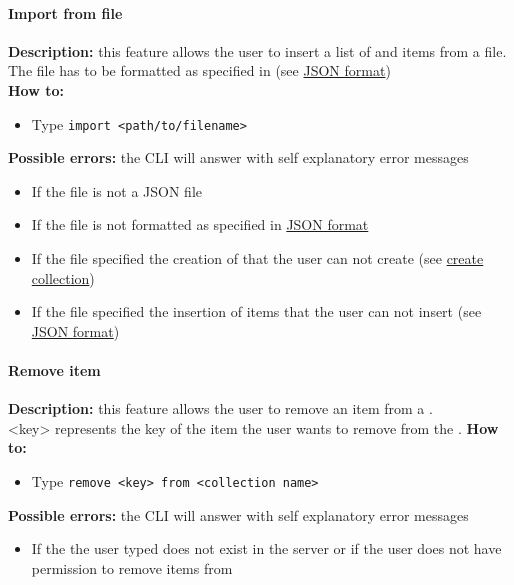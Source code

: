 \documentclass{scalatekids-article}
\begin{document}
\paragraph{Import from file}
\label{sec:import}
\textbf{Description:} this feature allows the user to insert a list of  and items from a file.\\
The file has to be formatted as specified in (see \hyperref[sec:JSONFormat]{JSON format})\\%
\textbf{How to:}
\begin{itemize}
\item Type \texttt{import <path/to/filename>}
\end{itemize}
\textbf{Possible errors:} the CLI will answer with self explanatory error messages
\begin{itemize}
\item If the file is not a JSON file
\item If the file is not formatted as specified in \hyperref[sec:JSONFormat]{JSON format}%
\item If the file specified the creation of  that the user can not create (see \hyperref[sec:createcollection]{create collection})
\item If the file specified the insertion of items that the user can not insert (see \hyperref[sec:JSONFormat]{JSON format})
\end{itemize}

\paragraph{Remove item}
\label{sec:removeitem}
\textbf{Description:} this feature allows the user to remove an item from a .\\
<key> represents the key of the item the user wants to remove from the .
\textbf{How to:}
\begin{itemize}
\item Type \texttt{remove <key> from <collection name>}
\end{itemize}
\textbf{Possible errors:} the CLI will answer with self explanatory error messages
\begin{itemize}
\item If the  the user typed does not exist in the server or if the user does not have permission to remove items from
\end{itemize}
\end{document}
